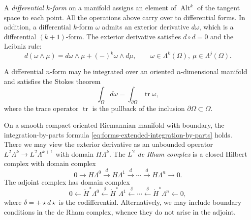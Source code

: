 \begin{tcolorbox}[enhanced,breakable,colback=KuangNei,frame hidden,boxrule=0pt,sharpish corners,before skip=10pt,after skip=10pt]
{A \emph{differential $k$-form} on a manifold assigns an element of $\operatorname{Alt}^k$ of the tangent space to each point. All the operations above carry over to differential forms. In addition, a differential $k$-form $\omega$ admits an exterior derivative $d\omega$, which is a differential $(k+1)$-form. The exterior derivative satisfies $d\circ d=0$ and the Leibniz rule:}
\[
d(\omega\wedge\mu)=d\omega\wedge\mu+(-)^k\omega\wedge d\mu,\qquad\omega\in\Lambda^k(\Omega),\ \mu\in\Lambda^j(\Omega).
\]

{A differential $n$-form may be integrated over an oriented $n$-dimensional manifold and satisfies the Stokes theorem}
\[
\int_\Omega d\omega=\int_{\partial\Omega}\operatorname{tr}\omega,
\]
{where the trace operator $\operatorname{tr}$ is the pullback of the inclusion $\partial\Omega\subset\Omega$.}

{On a smooth compact oriented Riemannian manifold with boundary, the integration-by-parts formula \eqref{eq:forms-extended-integration-by-parts} holds. There we may view the exterior derivative as an unbounded operator $L^2\Lambda^k\to L^2\Lambda^{k+1}$ with domain $H\Lambda^k$. The \emph{$L^2$ de Rham complex} is a closed Hilbert complex with domain complex}
\[
0\to H\Lambda^0\xrightarrow{d}H\Lambda^1\xrightarrow{d}\cdots\xrightarrow{d}H\Lambda^n\to0.
\]
{The adjoint complex has domain complex}
\[
0\leftarrow\mathring H^*\Lambda^0\xleftarrow{\delta}\mathring H^*\Lambda^1\xleftarrow{\delta}\cdots\xleftarrow{\delta}\mathring H^*\Lambda^n\leftarrow0,
\]
{where $\delta=\pm\star d\star$ is the codifferential. Alternatively, we may include boundary conditions in the de Rham complex, whence they do not arise in the adjoint.}
\end{tcolorbox}

